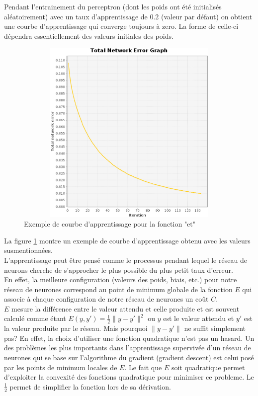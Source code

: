\documentclass[twoside,openright,a4paper,11pt,french]{article}
\begin{document}
Pendant l'entrainement du perceptron (dont les poids ont été initialisés
aléatoirement) avec un taux d'apprentissage de 0.2 (valeur par
défaut) on obtient une courbe d'apprentissage qui converge toujours à
zero. La forme de celle-ci dépendra essentiellement des valeurs initiales des
poids. 


\begin{figure}[ht]
\centering
\includegraphics[width=12cm,height=9cm]{./pics/and_error1.eps}
\caption{Exemple de courbe d'apprentissage pour la fonction "et"}
\label{fig:anderr}
\end{figure}

La figure \ref{fig:anderr} montre un exemple de courbe d'apprentissage
obtenu avec les valeurs susmentionnées.\\

L'apprentissage peut être pensé comme le processus pendant lequel le
réseau de neurons cherche de s'approcher le plus possible du plus petit
taux d'erreur.\\

En effet, la meilleure configuration (valeurs des poids, biais, etc.) pour
notre réseau de neurones correspond au point de minimum globale de la fonction
$E$ qui associe à chaque configuration de notre réseau de neurones un coût $C$.\\

$E$ mesure la différence entre le valeur attendu et celle produite et est
souvent calculé comme étant $E(y,y') = \tfrac{1}{2} \lVert y-y'\rVert^2$ ou $y$ est
le valeur attendu et $y'$ est la valeur produite par le réseau.
Mais pourquoi $\lVert y-y'\rVert$ ne suffit simplement pas? 
En effet, la choix d'utiliser une fonction quadratique n'est pas un hasard. 
Un des problèmes les plus importants dans l'apprentissage supervivée d'un réseau
de neurones qui se base sur l'algorithme du gradient (gradient descent) est
celui posé par les points de minimum locales de $E$. Le fait que $E$ soit
quadratique permet d'exploiter la convexité des fonctions quadratique pour
minimiser ce probleme. Le $\tfrac{1}{2}$ permet de simplifier la fonction lors
de sa dérivation.\\
\end{document}
